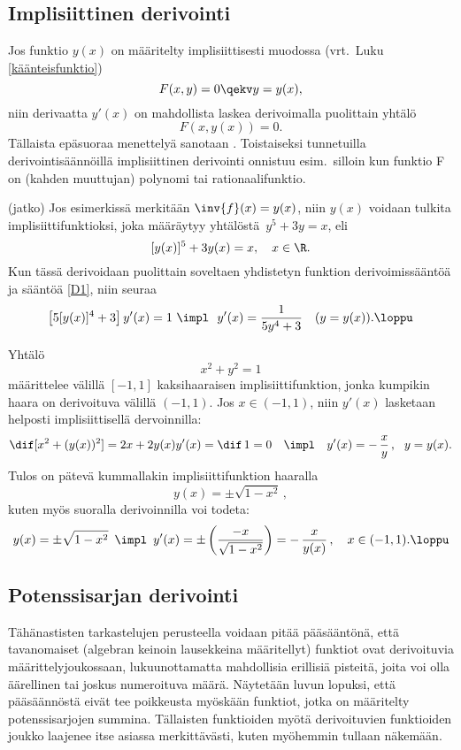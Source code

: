 \subsection{Implisiittinen derivointi}
 

Jos funktio $y(x)$ on määritelty implisiittisesti muodossa (vrt.\ Luku \ref{käänteisfunktio})
\[ 
F(x,y) = 0 \qekv y = y(x), 
\]
niin derivaatta $y'(x)$ on mahdollista laskea derivoimalla puolittain yhtälö
\[ 
F(x,y(x)) = 0.
\]
Tällaista epäsuoraa menettelyä sanotaan . Toistaiseksi
tunnetuilla derivointisäännöillä implisiittinen derivointi onnistuu esim.\ silloin kun
funktio F on (kahden muuttujan) polynomi tai rationaalifunktio.
\jatko \begin{Exa} (jatko) Jos esimerkissä merkitään $\inv{f}(x)=y(x)$, niin $y(x)$ voidaan
tulkita implisiittifunktioksi, joka määräytyy yhtälöstä $\,y^5+3y=x$, eli
\[
[y(x)]^5+3y(x)=x, \quad x\in\R.
\]
Kun tässä derivoidaan puolittain soveltaen yhdistetyn funktion derivoimissääntöä ja sääntöä
\eqref{D1}, niin seuraa
\[ 
\bigl[5[y(x)]^4+3\bigr]\,y'(x)=1\ \impl\ \ y'(x)=\frac{1}{5y^4+3} \quad (y=y(x)). \loppu
\]
\end{Exa}
\begin{Exa} Yhtälö 
\[ 
x^2 + y^2 = 1 
\]
määrittelee välillä $[-1,1]$ kaksihaaraisen implisiittifunktion, jonka kumpikin haara on
derivoituva välillä $(-1,1)$. Jos $x\in(-1,1)$, niin $y'(x)$ lasketaan helposti
implisiittisellä dervoinnilla:
\begin{align*}
 \dif[x^2 + (y(x))^2] &= 2x + 2y(x)y'(x) = \dif\,1 = 0
                      &\impl \quad y'(x) = -\,\dfrac{x}{y}\,,\ \ y=y(x).
\end{align*}
Tulos on pätevä kummallakin implisiittifunktion haaralla
\[ 
y(x) = \pm \sqrt{1-x^2}\,, 
\]
kuten myös suoralla derivoinnilla voi todeta:
\[
y(x) = \pm\sqrt{1-x^2}\,\ \impl\,\ y'(x) = \pm\left(\frac{-x}{\sqrt{1-x^2}}\right) 
                                         = -\,\frac{x}{y(x)}\,, \quad x \in (-1,1). \loppu
\]
\end{Exa}

\subsection{Potenssisarjan derivointi}

Tähänastisten tarkastelujen perusteella voidaan pitää pääsääntönä, että tavanomaiset
(algebran keinoin lausekkeina määritellyt) funktiot ovat derivoituvia määrittelyjoukossaan,
lukuunottamatta mahdollisia erillisiä pisteitä, joita voi olla äärellinen tai joskus
numeroituva määrä. Näytetään luvun lopuksi, että pääsäännöstä eivät tee poikkeusta myöskään
funktiot, jotka on määritelty potenssisarjojen summina. Tällaisten funktioiden myötä
derivoituvien funktioiden joukko laajenee itse asiassa merkittävästi, kuten myöhemmin tullaan
näkemään.

